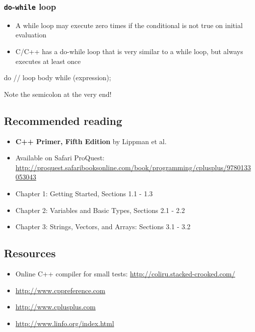 \documentclass[12pt,letterpaper,twoside]{article}
\begin{document}
\subsubsection{\texorpdfstring{\texttt{do}-\texttt{while} loop}{do-while loop}}
\begin{itemize}
\item
  A while loop may execute zero times if the conditional is not true on
  initial evaluation
\item
  C/C++ has a do-while loop that is very similar to a while loop, but
  always executes at least once
\end{itemize}

\begin{cpp}
do {
  // loop body
} while (expression);
\end{cpp}

Note the semicolon at the very end!
\newpage
\subsection{Recommended reading}
\begin{itemize}
\item
  \textbf{C++ Primer, Fifth Edition} by Lippman et al.
\item
  Available on Safari ProQuest:
  \url{http://proquest.safaribooksonline.com/book/programming/cplusplus/9780133053043}
\item
  Chapter 1: Getting Started, Sections 1.1 - 1.3
\item
  Chapter 2: Variables and Basic Types, Sections 2.1 - 2.2
\item
  Chapter 3: Strings, Vectors, and Arrays: Sections 3.1 - 3.2
\end{itemize}

\hypertarget{resources}{%
\subsection{Resources}\label{resources}}

\begin{itemize}
\item
  Online C++ compiler for small tests:
  \url{http://coliru.stacked-crooked.com/}
\item
  \url{http://www.cppreference.com}
\item
  \url{http://www.cplusplus.com}
\item
  \url{http://www.linfo.org/index.html}
\end{itemize}
\end{document}
